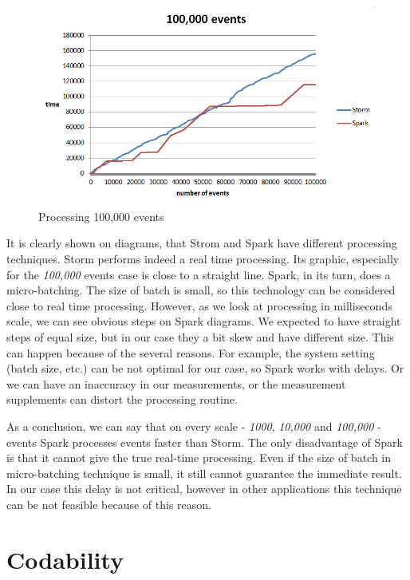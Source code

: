 \begin{figure}
  \centering
  \includegraphics [width=1.0\textwidth]{images/exp3}
  \caption{Processing 100,000 events}
  \label{fig:100000events}
\end{figure}

It is clearly shown on diagrams, that Strom and Spark have different processing techniques.
Storm performs indeed a real time processing.
Its graphic, especially for the \textit{100,000} events case is close to a straight line.
Spark, in its turn, does a micro-batching.
The size of batch is small, so this technology can be considered close to real time processing.
However, as we look at processing in milliseconds scale, we can see obvious steps on Spark diagrams. 
We expected to have straight steps of equal size, but in our case they a bit skew and have different size.
This can happen because of the several reasons.
For example, the system setting (batch size, etc.) can be not optimal for our case, so Spark works with delays.
Or we can have an inaccuracy in our measurements, or the measurement supplements can distort the processing routine.    

As a conclusion, we can say that on every scale - \textit{1000}, \textit{10,000} and \textit{100,000} - events Spark processes events faster than Storm.
The only disadvantage of Spark is that it cannot give the true real-time processing.
Even if the size of batch in micro-batching technique is small, it still cannot guarantee the immediate result.
In our case this delay is not critical, however in other applications this technique can be not feasible because of this reason.  

\section{Codability}

